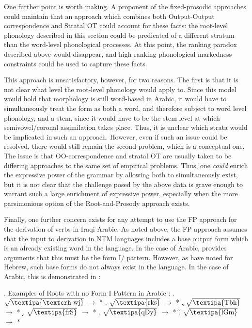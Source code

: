 \documentclass[12pt,twoside,letterpaper]{article}
\begin{document}
One further point is worth making. A proponent of the fixed-prosodic approaches could maintain that an approach which combines both Output-Output correspondence and Stratal OT could account for these facts: the root-level phonology described in this section could be predicated of a different stratum than the word-level phonological processes. At this point, the ranking paradox described above would disappear, and high-ranking phonological markedness constraints could be used to capture these facts.

This approach is unsatisfactory, however, for two reasons. The first is that it is not clear what level the root-level phonology would apply to. Since this model would hold that morphology is still word-based in Arabic, it would have to simultaneously treat the \emph{} form as both a word, and therefore subject to word level phonology, and a stem, since it would have to be the stem level at which semivowel/coronal assimilation takes place. Thus, it is unclear which strata would be implicated in such an approach. However, even if such an issue could be resolved, there  would still remain the second problem, which is a conceptual one. The issue is that OO-correspondence and stratal OT are usually taken to be differing approaches to the same set of empirical problems. Thus, one \emph{could} enrich the expressive power of the grammar by allowing both to simultaneously exist, but it is not clear that the challenge posed by the above data is grave enough to warrant such a large enrichment of expressive power, especially when the more parsimonious option of the Root-and-Prosody approach exists.

Finally, one further concern exists for any attempt to use the FP approach for the derivation of verbs in Iraqi Arabic. As noted above, the FP approach assumes that the input to derivation in NTM languages includes a base output form which is an already existing word in the language. In the case of Arabic, \cite[ch.6]{ussishkin00} provides arguments that this must be the form I/{\em {}} pattern. However, as \cite{marantz97,arad03,arad05} have noted for Hebrew, such base forms do not always exist in the language. In the case of Arabic, this is demonstrated in \Next:

\ex. Examples of Roots with no Form I {\em {}} Pattern in Arabic \citep{wehr76}:
\a. $\sqrt{\textrm{\textipa{\textcrh wj}}}$ $\rightarrow$ *\textcrh{}
\b. $\sqrt{\textrm{\textipa{rks}}}$ $\rightarrow$ *
\c. $\sqrt{\textrm{\textipa{Tbh}}}$ $\rightarrow$ *
\d. $\sqrt{\textrm{\textipa{frS}}}$ $\rightarrow$ *
\e. $\sqrt{\textrm{\textipa{qDy}}}$ $\rightarrow$ *
\f. $\sqrt{\textrm{\textipa{lGm}}}$ $\rightarrow$ *
\end{document}
